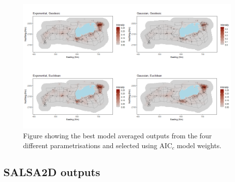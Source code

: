 \begin{figure}[!htb]
\centering
\includegraphics[width=0.9\linewidth]{suppimages/modelavgpredplots.png}
\caption{Figure showing the best model averaged outputs from the four different parametrisations and selected using AIC$_c$ model weights.}
\label{fig:modelavgall}
\end{figure}

\clearpage



\subsection*{SALSA2D outputs}

